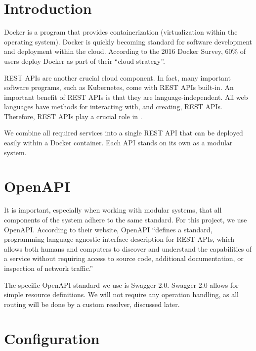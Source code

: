 
\maketitle

\section{Introduction}

Docker is a program that provides containerization (virtualization
within the operating system). Docker is quickly becoming standard for
software development and deployment within the cloud. According to the
2016 Docker Survey, 60\% of users deploy Docker as part of their ``cloud
strategy''\cite{hid-sp18-526-www-docker-survey}.

REST APIs are another crucial cloud component. In fact, many important software
programs, such as Kubernetes, come with REST APIs built-in. An important
benefit of REST APIs is that they are language-independent. All web languages
have methods for interacting with, and creating, REST APIs. Therefore, REST
APIs play a crucial role in \projectname.

We combine all required services into a single REST API that can be deployed
easily within a Docker container. Each API stands on its own as a modular
system.

\section{OpenAPI}

It is important, especially when working with modular systems, that all
components of the system adhere to the same standard. For this project,
we use OpenAPI. According to their website, OpenAPI ``defines a standard,
programming language-agnostic interface description for REST APIs, which allows
both humans and computers to discover and understand the capabilities of a
service without requiring access to source code, additional documentation,
or inspection of network traffic.''\cite{hid-sp18-526-www-openapi}

The specific OpenAPI standard we use is Swagger 2.0. Swagger 2.0 allows for
simple resource definitions. We will not require any operation handling,
as all routing will be done by a custom resolver, discussed later.

\section{Configuration}


